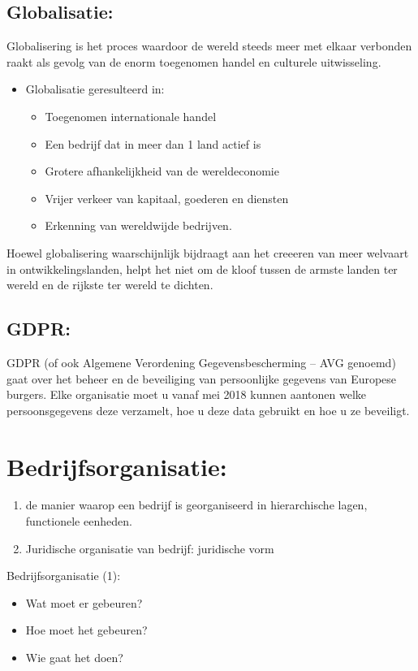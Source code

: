 \documentclass[12pt]{article}
\begin{document}
\subsection{Globalisatie:}
Globalisering is het proces waardoor de wereld steeds meer met elkaar 
verbonden raakt als gevolg van de enorm toegenomen handel en culturele 
uitwisseling.
\begin{itemize}
    \item Globalisatie geresulteerd in:\begin{itemize}
        \item Toegenomen internationale handel
        \item Een bedrijf dat in meer dan 1 land actief is
        \item Grotere afhankelijkheid van de wereldeconomie
        \item Vrijer verkeer van kapitaal, goederen en diensten
        \item Erkenning van wereldwijde bedrijven.
    \end{itemize}
\end{itemize}
Hoewel globalisering waarschijnlijk bijdraagt aan het creeeren van meer welvaart in ontwikkelingslanden, helpt het niet om de kloof tussen de armste landen ter wereld en de rijkste ter wereld te dichten.
\subsection{GDPR:}
GDPR (of ook Algemene Verordening Gegevensbescherming – AVG 
genoemd) gaat over het beheer en de beveiliging van persoonlijke 
gegevens van Europese burgers. Elke organisatie moet u vanaf mei 2018 
kunnen aantonen welke persoonsgegevens deze verzamelt, hoe u deze 
data gebruikt en hoe u ze beveiligt.
\section{Bedrijfsorganisatie:}
\begin{enumerate}
    \item de manier waarop een bedrijf is georganiseerd in hierarchische lagen, functionele eenheden.
    \item Juridische organisatie van bedrijf: juridische vorm
\end{enumerate}
Bedrijfsorganisatie (1):
\begin{itemize}
    \item Wat moet er gebeuren?
    \item Hoe moet het gebeuren?
    \item Wie gaat het doen?
\end{itemize}
\end{document}
